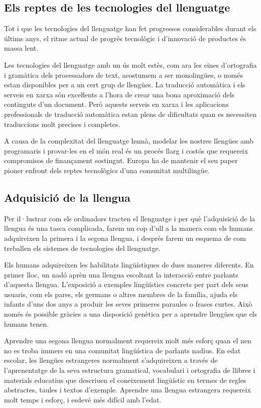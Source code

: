 \begin{multicols}{2}
\subsection{Els reptes de les tecnologies del llenguatge}

Tot i que les tecnologies del llenguatge han fet progressos considerables durant els últims anys, el ritme actual de progrés tecnològic i d’innovació de productes és massa lent.

Les tecnologies del llenguatge amb un ús molt estès, com ara les eines d’ortografia i gramàtica dels processadors de text, acostumem a ser monolingües, o només estan disponibles per a un cert grup de llengües. La traducció automàtica i els serveis en xarxa són exceŀlents a l’hora de crear una bona aproximació dels continguts d’un document. Però aquests serveis en xarxa i les aplicacions professionals de traducció automàtica estan plens de dificultats quan es necessiten traduccions molt precises i completes. 

A causa de la complexitat del llenguatge humà, modelar les nostres llengües amb programaris i provar-les en el món real és un procés llarg i costós que requereix compromisos de finançament sostingut. Europa ha de mantenir el seu paper pioner enfront dels reptes tecnològics d'una comunitat multilingüe.

\subsection{Adquisició de la llengua}

Per il·lustrar com els ordinadors tracten el llenguatge i per què l’adquisició de la llengua és una tasca complicada, farem un cop d’ull a la manera com els humans adquireixen la primera i la segona llengua, i després farem un esquema de com treballen els sistemes de tecnologies del llenguatge.

Els humans adquireixen les habilitats lingüístiques de dues maneres diferents. En primer lloc, un nadó aprèn una llengua escoltant la interacció entre parlants d’aquesta llengua. L’exposició a exemples lingüístics concrets per part dels seus usuaris, com els pares, els germans o altres membres de la família, ajuda els infants d’uns dos anys a produir les seves primeres paraules o frases curtes. Això només és possible gràcies a una disposició genètica per a aprendre llengües que els humans tenen.

Aprendre una segona llengua normalment requereix molt més esforç quan el nen no es troba immers en una comunitat lingüística de parlants nadius. En edat escolar, les llengües estrangeres normalment s’adquireixen a través de l’aprenentatge de la seva estructura gramatical, vocabulari i ortografia de llibres i materials educatius que descriuen el coneixement lingüístic en termes de regles abstractes, taules i textos d’exemple. Aprendre una llengua estrangera requereix molt temps i esforç, i esdevé més difícil amb l’edat.


\end{multicols}
